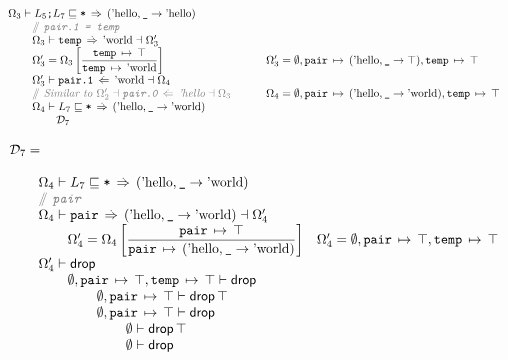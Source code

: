 \documentclass[12pt,twoside]{report}
\begin{document}
{\[\begin{array}{ll}
  \Omega_3 \vdash L_5\mono{;}L_7 \subtype \mono{*} \movearrowabs (\atom{hello}, \mono{\_} \rightarrow \atom{hello}) \\
  \otab \ocomment{\mono{pair.1 = temp}} \\
  \otab \Omega_3 \vdash \mono{temp} \movearrowabs \atom{world} \dashv \Omega_3' \\
  \otab \Omega_3' = \Omega_3\left[\dfrac{\absmapm{temp}{\top}}{\absmapm{temp}{\atom{world}}}\right] &
  \otab \Omega_3' = \emptyset, \absmapm{pair}{(\atom{hello}, \mono{\_} \rightarrow \top)}, \absmapm{temp}{\top} \\
  \otab \Omega_3' \vdash \mono{pair.1} \writearrowabs \atom{world} \dashv \Omega_4 \\
  \otab \ocomment{Similar to $\Omega_2' \dashv \mono{pair.0} \writearrowabs \atom{hello} \dashv \Omega_3$} &
  \otab \Omega_4 = \emptyset,\absmapm{pair}{(\atom{hello}, \mono{\_} \rightarrow \atom{world})}, \absmapm{temp}{\top} \\
  \otab \Omega_4 \vdash L_7 \subtype \mono{*} \movearrowabs (\atom{hello}, \mono{\_} \rightarrow \atom{world}) \\
  \otab\otab \mathcal{D}_7 \\
\end{array}\]

\[\begin{array}{ll}
  \mathcal{D}_7 = \\\\

  \otab \Omega_4 \vdash L_7 \subtype \mono{*} \movearrowabs (\atom{hello}, \mono{\_} \rightarrow \atom{world}) \\
  \otab \ocomment{\mono{pair}} \\
  \otab \Omega_4 \vdash \mono{pair} \movearrowabs (\atom{hello}, \mono{\_} \rightarrow \atom{world}) \dashv \Omega_4' \\
  \otab \otab \Omega_4' = \Omega_4\left[\dfrac{\absmapm{pair}{\top}}{\absmapm{pair}{(\atom{hello}, \mono{\_} \rightarrow \atom{world})}}\right] &
    \Omega_4' = \emptyset, \absmapm{pair}{\top}, \absmapm{temp}{\top} \\
  \otab \Omega_4' \vdash \drop{} \\
  \otab \otab \emptyset, \absmapm{pair}{\top}, \absmapm{temp}{\top} \vdash \kw{drop} \\
  \otab \otab\otab \emptyset, \absmapm{pair}{\top} \vdash \drop{\top} \\
  \otab \otab\otab \emptyset, \absmapm{pair}{\top} \vdash \drop{} \\
  \otab \otab\otab\otab \emptyset \vdash \drop{\top} \\
  \otab \otab\otab\otab \emptyset \vdash \drop{} \\

\end{array}\]
}
\end{document}
